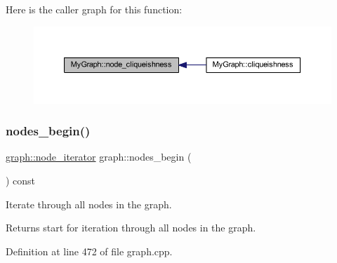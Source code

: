 Here is the caller graph for this function\+:
\nopagebreak
\begin{figure}[H]
\begin{center}
\leavevmode
\includegraphics[width=350pt]{class_my_graph_a513bec2f1949a01d517dd57cc9c30233_icgraph}
\end{center}
\end{figure}
\mbox{\label{classgraph_aec053a4b509d1be804237a80044c54c0}} 
\subsubsection{\texorpdfstring{nodes\+\_\+begin()}{nodes\_begin()}}
{\footnotesize\ttfamily \mbox{\hyperlink{classgraph_a2cb374b84c133ce13f94e73c3e5da7fa}{graph\+::node\+\_\+iterator}} graph\+::nodes\+\_\+begin (\begin{DoxyParamCaption}{ }\end{DoxyParamCaption}) const\hspace{0.3cm}{\ttfamily [inherited]}}

Iterate through all nodes in the graph.

\begin{DoxyReturn}{Returns}
start for iteration through all nodes in the graph. 
\end{DoxyReturn}


Definition at line 472 of file graph.\+cpp.


